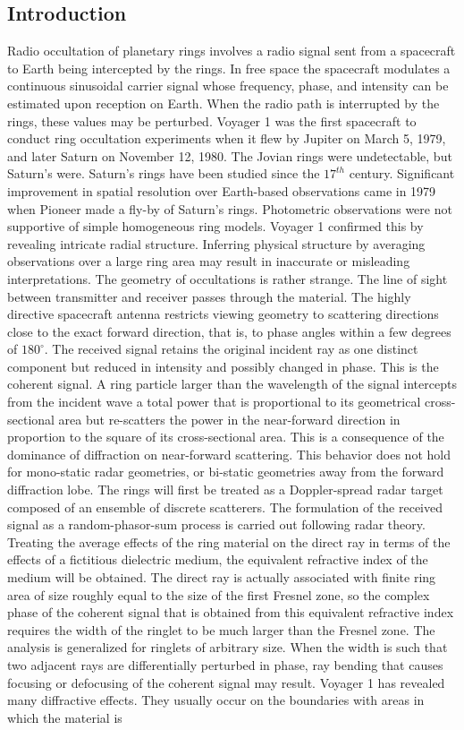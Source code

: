 \documentclass[oneside]{book}
\theoremstyle{mystyle}
\begin{document}
\subsection{Introduction}
\noindent Radio occultation of planetary rings involves a radio signal sent from a spacecraft to Earth being intercepted by the rings. In free space the spacecraft modulates a continuous sinusoidal carrier signal whose frequency, phase, and intensity can be estimated upon reception on Earth. When the radio path is interrupted by the rings, these values may be perturbed. Voyager 1 was the first spacecraft to conduct ring occultation experiments when it flew by Jupiter on March 5, 1979, and later Saturn on November 12, 1980. The Jovian rings were undetectable, but Saturn's were. Saturn's rings have been studied since the $17^{th}$ century. Significant improvement in spatial resolution over Earth-based observations came in 1979 when Pioneer made a fly-by of Saturn's rings. Photometric observations were not supportive of simple homogeneous ring models. Voyager 1 confirmed this by revealing intricate radial structure. Inferring physical structure by averaging observations over a large ring area may result in inaccurate or misleading interpretations. The geometry of occultations is rather strange. The line of sight between transmitter and receiver passes through the material. The highly directive spacecraft antenna restricts viewing geometry to scattering directions close to the exact forward direction, that is, to phase angles within a few degrees of $180^{\circ}$. The received signal retains the original incident ray as one distinct component but reduced in intensity and possibly changed in phase. This is the coherent signal. A ring particle larger than the wavelength of the signal intercepts from the incident wave a total power that is proportional to its geometrical cross-sectional area but re-scatters the power in the near-forward direction in proportion to the square of its cross-sectional area. This is a consequence of the dominance of diffraction on near-forward scattering. This behavior does not hold for mono-static radar geometries, or bi-static geometries away from the forward diffraction lobe. The rings will first be treated as a Doppler-spread radar target composed of an ensemble of discrete scatterers. The formulation of the received signal as a random-phasor-sum process is carried out following radar theory. Treating the average effects of the ring material on the direct ray in terms of the effects of a fictitious dielectric medium, the equivalent refractive index of the medium will be obtained. The direct ray is actually associated with finite ring area of size roughly equal to the size of the first Fresnel zone, so the complex phase of the coherent signal that is obtained from this equivalent refractive index requires the width of the ringlet to be much larger than the Fresnel zone. The analysis is generalized for ringlets of arbitrary size. When the width is such that two adjacent rays are differentially perturbed in phase, ray bending that causes focusing or defocusing of the coherent signal may result. Voyager 1 has revealed many diffractive effects. They usually occur on the boundaries with areas in which the material is 
\end{document}
